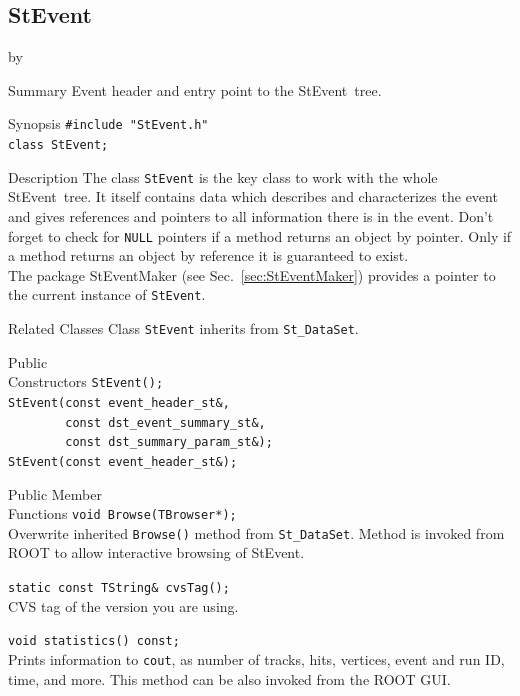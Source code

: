 \documentclass[twoside]{article}
\newcommand{\StEvent}{\textsf{StEvent}}
\newcommand{\entrylabel}[1]{\mbox{\textbf{{#1}}}\hfil}%
\newenvironment{entry}
{\begin{list}{}%
    {\renewcommand{\makelabel}{\entrylabel}%
     \setlength{\labelwidth}{90pt}%
     \setlength{\leftmargin}{\labelwidth}
     \advance\leftmargin by \labelsep%
      }%
    }%
  {\end{list}}
\newcommand{\Entrylabel}[1]%
{\raisebox{0pt}[1ex][0pt]{\makebox[\labelwidth][l]%
    {\parbox[t]{\labelwidth}{\hspace{0pt}\textbf{{#1}}}}}}
\newenvironment{Entry}%
{\renewcommand{\entrylabel}{\Entrylabel}\begin{entry}}%
  {\end{entry}}
\begin{document}
\subsection{StEvent}
\label{sec:StEvent}
\begin{Entry}
\item[Summary] Event header and entry point to the \StEvent\ tree.
\item[Synopsis]
    \verb+#include "StEvent.h"+\\
    \verb+class StEvent;+\\
\item[Description] The class \texttt{StEvent} is the key class to work
    with the whole \StEvent\ tree. It itself contains data which
    describes and characterizes the event and gives references and
    pointers to all information there is in the event.  Don't forget
    to check for \texttt{NULL} pointers if a method returns an object
    by pointer. Only if a method returns an object by reference
    it is guaranteed to exist.\\
    The package StEventMaker (see Sec.~\ref{sec:StEventMaker})
    provides a pointer to the current instance of \texttt{StEvent}.
\item[Related Classes] Class \texttt{StEvent} inherits from
    \texttt{St\_DataSet}.
\item[Public\\ Constructors]
    \verb+StEvent();+\\
    
    \verb+StEvent(const event_header_st&,+\\
    \verb+        const dst_event_summary_st&,+\\
    \verb+        const dst_summary_param_st&);+\\
    
    \verb+StEvent(const event_header_st&);+\\
    
\item[Public Member\\ Functions]
    \verb+void Browse(TBrowser*);+\\
    Overwrite inherited \texttt{Browse()} method from \texttt{St\_DataSet}.
    Method is invoked from ROOT to allow interactive browsing of \StEvent. 

    \verb+static const TString& cvsTag();+\\
    CVS tag of the version you are using.
    
    \verb+void statistics() const;+\\
    Prints information to \texttt{cout}, as number of tracks, hits,
    vertices, event and run ID, time, and more. This method can be also
    invoked from the ROOT GUI.
    

\end{Entry}
\end{document}
